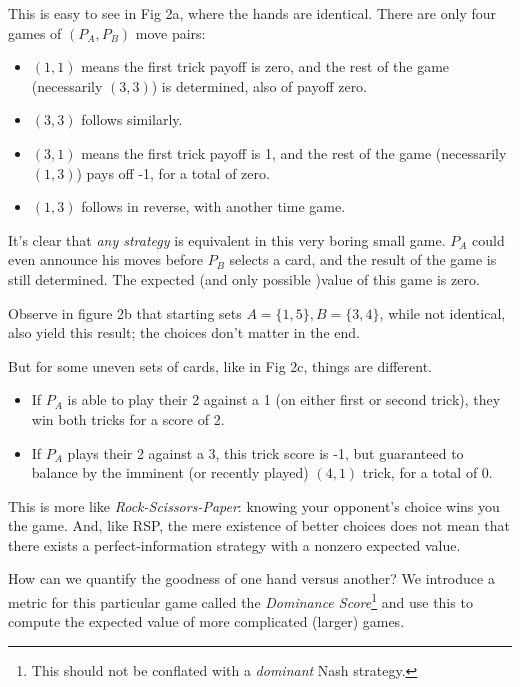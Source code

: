 \documentclass[11pt, oneside]{article} 	%
\begin{document}
This is easy to see in Fig 2a, where the hands are identical. There are only four games of $(P_A, P_B)$ move pairs:
\begin{itemize}
\item $(1,1)$ means the first trick payoff is zero, and the rest of the game (necessarily $(3,3)$) is determined, also of payoff zero.
\item $(3,3)$ follows similarly.
\item $(3,1)$ means the first trick payoff is 1, and the rest of the game (necessarily $(1,3)$) pays off -1, for a total of zero.
\item $(1,3)$ follows in reverse, with another time game.
\end{itemize}

It's clear that \emph{any strategy} is equivalent in this very boring small game. $P_A$ could even announce his moves before $P_B$ selects a card, and the result of the game is still determined. The expected (and only possible )value of this game is zero.

Observe in figure 2b that starting sets $A =\{1,5\}, B= \{3,4\}$, while not identical, also yield this result; the choices don't matter in the end.

But for some uneven sets of cards, like in Fig 2c, things are different.
\begin{itemize}
\item If $P_A$ is able to play their 2 against a 1 (on either first or second trick), they win both tricks for a score of 2.
\item If $P_A$ plays their 2 against a 3, this trick score is -1, but guaranteed to balance by the imminent (or recently played) $(4,1)$ trick, for a total of 0.
\end{itemize}

This is more like \emph{Rock-Scissors-Paper}: knowing your opponent's choice wins you the game. And, like RSP, the mere existence of better choices does not mean that there exists a perfect-information strategy with a nonzero expected value.

How can we quantify the goodness of one hand versus another? We introduce a metric for this particular game called the \emph{Dominance Score}\footnote{This should not be conflated with a \emph{dominant} Nash strategy.}  and use this to compute the expected value of more complicated (larger) games.
\end{document}
